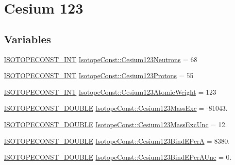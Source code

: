\hypertarget{group___isotope_const-_cesium-_cs123}{}\section{Cesium 123}
\label{group___isotope_const-_cesium-_cs123}
\subsection*{Variables}
\begin{DoxyCompactItemize}
\item 
\mbox{\hyperlink{group___isotope_const-_macros_ga5f18360b3e99483a35c32d789e62621c}{I\+S\+O\+T\+O\+P\+E\+C\+O\+N\+S\+T\+\_\+\+I\+NT}} \mbox{\hyperlink{group___isotope_const-_cesium-_cs123_gaf4b1cdeac5283171ee23eb6342d47bad}{Isotope\+Const\+::\+Cesium123\+Neutrons}} = 68
\item 
\mbox{\hyperlink{group___isotope_const-_macros_ga5f18360b3e99483a35c32d789e62621c}{I\+S\+O\+T\+O\+P\+E\+C\+O\+N\+S\+T\+\_\+\+I\+NT}} \mbox{\hyperlink{group___isotope_const-_cesium-_cs123_ga84623c3dab39ae53239deff957d131be}{Isotope\+Const\+::\+Cesium123\+Protons}} = 55
\item 
\mbox{\hyperlink{group___isotope_const-_macros_ga5f18360b3e99483a35c32d789e62621c}{I\+S\+O\+T\+O\+P\+E\+C\+O\+N\+S\+T\+\_\+\+I\+NT}} \mbox{\hyperlink{group___isotope_const-_cesium-_cs123_gaf7904bf590fc12bd43fa108a6a1f99de}{Isotope\+Const\+::\+Cesium123\+Atomic\+Weight}} = 123
\item 
\mbox{\hyperlink{group___isotope_const-_macros_ga8f45a7272ce02c0b4c65c44636ed719a}{I\+S\+O\+T\+O\+P\+E\+C\+O\+N\+S\+T\+\_\+\+D\+O\+U\+B\+LE}} \mbox{\hyperlink{group___isotope_const-_cesium-_cs123_ga5b6768e70373a91c0fd70691891256fd}{Isotope\+Const\+::\+Cesium123\+Mass\+Exc}} = -\/81043.
\item 
\mbox{\hyperlink{group___isotope_const-_macros_ga8f45a7272ce02c0b4c65c44636ed719a}{I\+S\+O\+T\+O\+P\+E\+C\+O\+N\+S\+T\+\_\+\+D\+O\+U\+B\+LE}} \mbox{\hyperlink{group___isotope_const-_cesium-_cs123_ga26318e9d3fc47c1c1b462ff3b8900d22}{Isotope\+Const\+::\+Cesium123\+Mass\+Exc\+Unc}} = 12.
\item 
\mbox{\hyperlink{group___isotope_const-_macros_ga8f45a7272ce02c0b4c65c44636ed719a}{I\+S\+O\+T\+O\+P\+E\+C\+O\+N\+S\+T\+\_\+\+D\+O\+U\+B\+LE}} \mbox{\hyperlink{group___isotope_const-_cesium-_cs123_ga8745d59fc3d4495cbd9fe9d9a254617b}{Isotope\+Const\+::\+Cesium123\+Bind\+E\+PerA}} = 8380.
\item 
\mbox{\hyperlink{group___isotope_const-_macros_ga8f45a7272ce02c0b4c65c44636ed719a}{I\+S\+O\+T\+O\+P\+E\+C\+O\+N\+S\+T\+\_\+\+D\+O\+U\+B\+LE}} \mbox{\hyperlink{group___isotope_const-_cesium-_cs123_ga86e08b3eecc4b164b5cda72a46a2562c}{Isotope\+Const\+::\+Cesium123\+Bind\+E\+Per\+A\+Unc}} = 0.

\end{DoxyCompactItemize}

